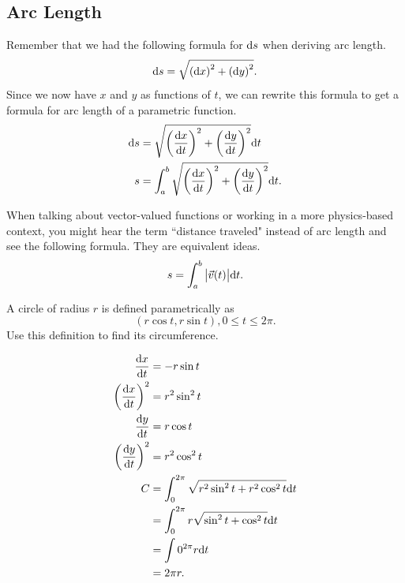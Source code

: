 \subsection{Arc Length}
Remember that we had the following formula for $\mathrm{d} s$ when deriving arc length.
\begin{equation*}
	\mathrm{d} s = \sqrt{\left(\mathrm{d} x\right)^2 + \left(\mathrm{d} y\right)^2}.
\end{equation*}
Since we now have $x$ and $y$ as functions of $t$, we can rewrite this formula to get a formula for arc length of a parametric function.
\begin{align*}
	\mathrm{d} s &= \sqrt{\left(\frac{\mathrm{d} x}{\mathrm{d} t}\right)^2 + \left(\frac{\mathrm{d} y}{\mathrm{d} t}\right)^2}\mathrm{d} t \\
	s &= \int_{a}^{b}{\sqrt{\left(\frac{\mathrm{d} x}{\mathrm{d} t}\right)^2 + \left(\frac{\mathrm{d} y}{\mathrm{d} t}\right)^2}\mathrm{d} t}.
\end{align*}

When talking about vector-valued functions or working in a more physics-based context, you might hear the term ``distance traveled" instead of arc length and see the following formula.
They are equivalent ideas.
\begin{equation*}
	s = \int_{a}^{b}{\big\lvert \vec{v}(t) \big\rvert\mathrm{d} t}.
\end{equation*}

\begin{example}
	A circle of radius $r$ is defined parametrically as
	\begin{equation*}
		(r\cos{t}, r\sin{t}), 0 \leq t \leq 2\pi.
	\end{equation*}
	Use this definition to find its circumference.
\end{example}
\begin{answer}
	\begin{align*}
		\frac{\mathrm{d} x}{\mathrm{d} t} &= -r\sin{t} \\
		\left(\frac{\mathrm{d} x}{\mathrm{d} t}\right)^2 &= r^2\sin^2{t} \\
		\frac{\mathrm{d} y}{\mathrm{d} t} &= r\cos{t} \\
		\left(\frac{\mathrm{d} y}{\mathrm{d} t}\right)^2 &= r^2\cos^2{t} \\
		C &= \int_{0}^{2\pi}{\sqrt{r^2\sin^2{t}+r^2\cos^2{t}}\mathrm{d} t} \\
		&= \int_{0}^{2\pi}{r\sqrt{\sin^2{t}+\cos^2{t}}\mathrm{d} t} \\
		&= \int{0}^{2\pi}{r\mathrm{d} t} \\
		&= 2\pi r.
	\end{align*}
\end{answer}